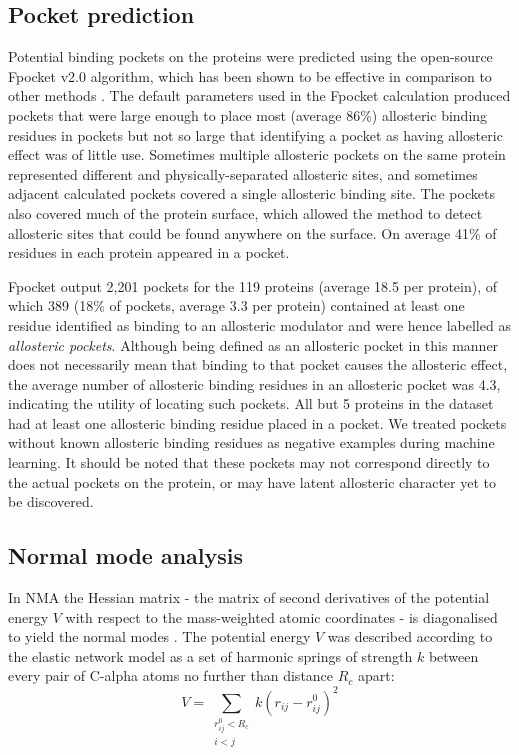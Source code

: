 \subsection{Pocket prediction}

Potential binding pockets on the proteins were predicted using the open-source Fpocket v2.0 algorithm, which has been shown to be effective in comparison to other methods \cite{LeGuilloux2009}.
The default parameters used in the Fpocket calculation produced pockets that were large enough to place most (average 86\%) allosteric binding residues in pockets but not so large that identifying a pocket as having allosteric effect was of little use.
Sometimes multiple allosteric pockets on the same protein represented different and physically-separated allosteric sites, and sometimes adjacent calculated pockets covered a single allosteric binding site.
The pockets also covered much of the protein surface, which allowed the method to detect allosteric sites that could be found anywhere on the surface.
On average 41\% of residues in each protein appeared in a pocket.

Fpocket output 2,201 pockets for the 119 proteins (average 18.5 per protein), of which 389 (18\% of pockets, average 3.3 per protein) contained at least one residue identified as binding to an allosteric modulator and were hence labelled as \emph{allosteric pockets}.
Although being defined as an allosteric pocket in this manner does not necessarily mean that binding to that pocket causes the allosteric effect, the average number of allosteric binding residues in an allosteric pocket was 4.3, indicating the utility of locating such pockets.
All but 5 proteins in the dataset had at least one allosteric binding residue placed in a pocket.
We treated pockets without known allosteric binding residues as negative examples during machine learning.
It should be noted that these pockets may not correspond directly to the actual pockets on the protein, or may have latent allosteric character yet to be discovered.


\subsection{Normal mode analysis}

In NMA the Hessian matrix - the matrix of second derivatives of the potential energy $V$ with respect to the mass-weighted atomic coordinates - is diagonalised to yield the normal modes \cite{Hayward2008}.
The potential energy $V$ was described according to the elastic network model \cite{Tirion1996} as a set of harmonic springs of strength $k$ between every pair of C-alpha atoms no further than distance $R_{c}$ apart:
$$
V = \sum_{\substack{r_{ij}^{0} < R_{c} \\ i < j}} k (r_{ij} - r_{ij}^{0})^{2}
$$

